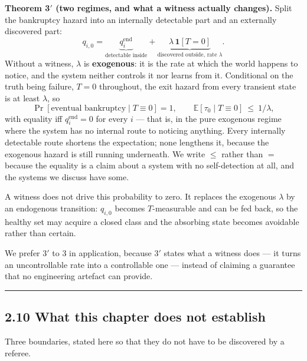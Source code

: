 \documentclass[11pt,a4paper]{article}
\newcounter{none}
\begin{document}
\textbf{Theorem 3\('\) (two regimes, and what a witness actually changes).} Split the
bankruptcy hazard into an internally detectable part and an externally discovered
part:
\begin{equation}
q_{i,0}=\underbrace{q^{\mathrm{end}}_{i}}_{\text{detectable inside}}
+\underbrace{\lambda\,\mathbf 1[T=0]}_{\text{discovered outside, rate }\lambda}.
\tag{2.9.4}
\end{equation}
Without a witness, \(\lambda\) is \textbf{exogenous}: it is the rate at which the world
happens to notice, and the system neither controls it nor learns from it. Conditional
on the truth being failure, \(T=0\) throughout, the exit hazard from every transient
state is at least \(\lambda\), so
\begin{equation}
\Pr[\text{eventual bankruptcy}\mid T\equiv0]=1,
\qquad
\mathbb E[\tau_0\mid T\equiv0]\ \le\ 1/\lambda ,
\tag{2.9.5}
\end{equation}
with equality iff \(q^{\mathrm{end}}_{i}=0\) for every \(i\) --- that is, in the pure
exogenous regime where the system has no internal route to noticing anything. Every
internally detectable route shortens the expectation; none lengthens it, because the
exogenous hazard is still running underneath. We write \(\le\) rather than \(=\) because
the equality is a claim about a system with no self-detection at all, and the systems
we discuss have some.

A witness does not drive this probability to zero. It replaces the exogenous
\(\lambda\) by an endogenous transition: \(q_{i,0}\) becomes \(T\)-measurable and can be
fed back, so the healthy set may acquire a closed class and the absorbing state
becomes avoidable rather than certain.

We prefer 3\('\) to 3 in application, because 3\('\) states what a witness does --- it turns
an uncontrollable rate into a controllable one --- instead of claiming a guarantee
that no engineering artefact can provide.

\begin{center}\rule{0.5\linewidth}{0.5pt}\end{center}

\subsection{2.10 What this chapter does not establish}\label{what-this-chapter-does-not-establish}

Three boundaries, stated here so that they do not have to be discovered by a
referee.
\end{document}
